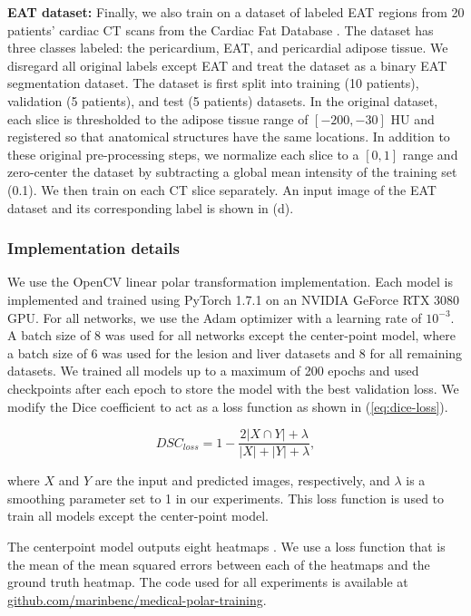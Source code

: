 \textbf{EAT dataset:} Finally, we also train on a dataset of labeled EAT regions from 20 patients' cardiac CT scans from 
the Cardiac Fat Database \cite{rodriguesNovelApproachAutomated2016}. The dataset has three classes labeled: 
the pericardium, EAT, and pericardial adipose tissue. We disregard all original labels except EAT and treat the dataset as a binary EAT segmentation dataset. The dataset is 
first split into training (10 patients), validation (5 patients), and test (5 patients) datasets. In the 
original dataset, 
each slice is thresholded to the adipose tissue range of $[-200, -30]$ HU and registered so that anatomical 
structures have the same locations. In addition to these original pre-processing steps, we normalize each 
slice to a $[0, 1]$ range and zero-center 
the dataset by subtracting a global mean intensity of the training set (0.1). We then train on 
each CT slice separately. An input image of the EAT dataset and its corresponding label is shown in 
(d).

    \subsubsection{Implementation details}

We use the OpenCV linear polar transformation implementation.
Each model is implemented and trained using PyTorch 1.7.1 on an NVIDIA GeForce RTX 3080 GPU. For all 
networks, we use the Adam optimizer with a learning rate of $10^{-3}$. A batch size of 8 was used for all 
networks except the center-point model, where a batch size of 6 was used for the lesion and liver datasets 
and 8 for all remaining datasets. We trained all models up to a maximum of 200 epochs and used checkpoints 
after each epoch to store the model with the best validation loss. We modify the Dice coefficient to act as a loss function as shown in (\ref{eq:dice-loss}).

  \begin{equation}
    \textit{DSC}_{loss} = 1 - \frac {2\lvert X\cap Y\rvert + \lambda}{\lvert X\rvert + \lvert Y\rvert + \lambda},
    \label{eq:dice-loss}
  \end{equation}
  
where $X$ and $Y$ are the input and predicted images, respectively, and $\lambda$ is a smoothing parameter set to 1 in our experiments. 
This loss function is used to train all models except the center-point model.

The centerpoint model outputs eight heatmaps \cite{newellStackedHourglassNetworks2016}. 
We use a loss function that is the mean of the mean squared errors between each of the heatmaps and the ground truth heatmap.
The code used for all experiments is available at \url{github.com/marinbenc/medical-polar-training}.

